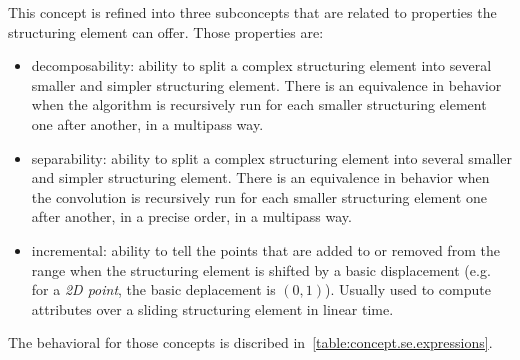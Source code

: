 This concept is refined into three subconcepts that are related to properties the structuring element can offer. Those
properties are:
\begin{itemize}
  \item decomposability: ability to split a complex structuring element into several smaller and simpler structuring
        element. There is an equivalence in behavior when the algorithm is recursively run for each smaller structuring
        element one after another, in a multipass way.
  \item separability: ability to split a complex structuring element into several smaller and simpler structuring
        element. There is an equivalence in behavior when the convolution is recursively run for each smaller structuring
        element one after another, in a precise order, in a multipass way.
  \item incremental: ability to tell the points that are added to or removed from the range when the structuring element
        is shifted by a basic displacement (e.g. for a \emph{2D point}, the basic deplacement is $(0,1)$). Usually used to
        compute attributes over a sliding structuring element in linear time.
\end{itemize}
The behavioral for those concepts is discribed in~\cref{table:concept.se.expressions}.

